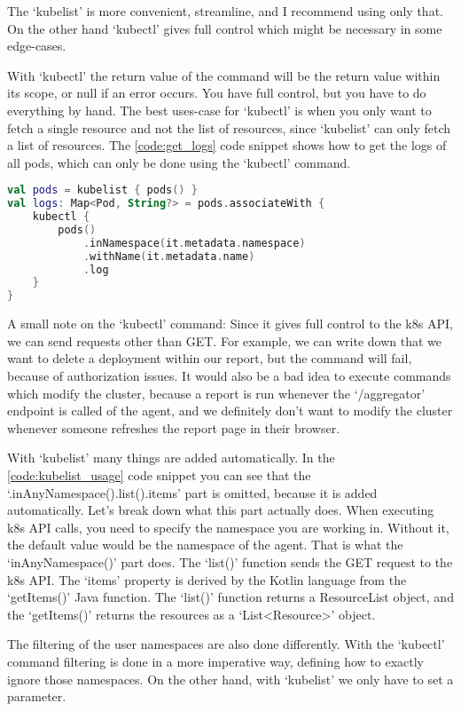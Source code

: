 The `kubelist' is more convenient, streamline, and I recommend using only that. On the other hand `kubectl' gives full control which might be necessary in some edge-cases.

With `kubectl' the return value of the command will be the return value within its scope, or null if an error occurs. You have full control, but you have to do everything by hand. The best uses-case for `kubectl' is when you only want to fetch a single resource and not the list of resources, since `kubelist' can only fetch a list of resources. The \ref{code:get_logs} code snippet shows how to get the logs of all pods, which can only be done using the `kubectl' command.

\begin{lstlisting}[caption={Download pod logs},language=Kotlin,label=code:get_logs]
val pods = kubelist { pods() }
val logs: Map<Pod, String?> = pods.associateWith {
    kubectl {
        pods()
            .inNamespace(it.metadata.namespace)
            .withName(it.metadata.name)
            .log
    }
}
\end{lstlisting}

A small note on the `kubectl' command: Since it gives full control to the k8s API, we can send requests other than GET. For example, we can write down that we want to delete a deployment within our report, but the command will fail, because of authorization issues. It would also be a bad idea to execute commands which modify the cluster, because a report is run whenever the `/aggregator' endpoint is called of the agent, and we definitely don't want to modify the cluster whenever someone refreshes the report page in their browser.

With `kubelist' many things are added automatically. In the \ref{code:kubelist_usage} code snippet you can see that the `.inAnyNamespace().list().items' part is omitted, because it is added automatically. Let's break down what this part actually does. When executing k8s API calls, you need to specify the namespace you are working in. Without it, the default value would be the namespace of the agent. That is what the `inAnyNamespace()' part does. The `list()' function sends the GET request to the k8s API. The `items' property is derived by the Kotlin language from the `getItems()' Java function. The `list()' function returns a ResourceList object, and the `getItems()' returns the resources as a `List<Resource>' object.

The filtering of the user namespaces are also done differently. With the `kubectl' command filtering is done in a more imperative way, defining how to exactly ignore those namespaces. On the other hand, with `kubelist' we only have to set a parameter.

